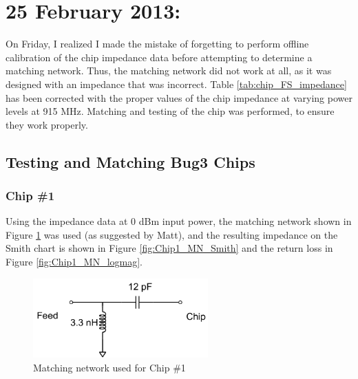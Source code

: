 \documentclass[12pt,onecolumn,titlepage]{article}
\begin{document}
\section{25 February 2013:}

\indent \indent On Friday, I realized I made the mistake of forgetting to perform offline calibration of the chip impedance data before attempting to determine a matching network. Thus, the matching network did not work at all, as it was designed with an impedance that was incorrect. Table \ref{tab:chip_FS_impedance} has been corrected with the proper values of the chip impedance at varying power levels at 915 MHz. Matching and testing of the chip was performed, to ensure they work properly.


\subsection{Testing and Matching Bug3 Chips}
\subsubsection{Chip \#1}
Using the impedance data at 0 dBm input power, the matching network shown in Figure \ref{fig:Chip1_MN_schematic} was used (as suggested by Matt), and the resulting impedance on the Smith chart is shown in Figure \ref{fig:Chip1_MN_Smith} and the return loss in Figure \ref{fig:Chip1_MN_logmag}.


\begin{figure}[htbp]
	\centering
	\includegraphics[width=0.6\textwidth]{Pictures/25Feb2013/Chip1_MN_schematic}
	\caption{Matching network used for Chip \#1 }
	\label{fig:Chip1_MN_schematic}
\end{figure}
\end{document}
